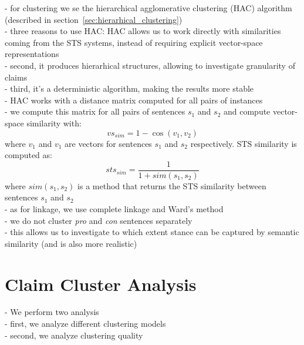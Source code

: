 - for clustering we se the hierarchical agglomerative clustering (HAC) algorithm
(described in section~\ref{sec:hierarhical_clustering}) \\
- three reasons to use HAC: HAC allows us to work directly with similarities
coming from the STS systems, instead of requiring explicit vector-space representations \\
- second, it produces hierarhical structures, allowing to investigate
granularity of claims \\
- third, it's a deterministic algorithm, making the results more stable \\
- HAC works with a distance matrix computed for all pairs of instances \\
- we compute this matrix for all pairs of sentences $s_1$ and $s_2$ and 
compute vector-space similarity with: 
$$
\mathit{vs_{sim}} = 1 - \cos(v_1, v_2)
$$ 
where $v_1$ and $v_1$ are vectors for sentences $s_1$ and $s_2$ respectively.
STS similarity is computed as:
$$
\mathit{sts_{sim}} = \frac{1}{1 + \mathit{sim}(s_1, s_2)}
$$
where $\mathit{sim}(s_1, s_2)$ is a method that returns the STS similarity
between sentences $s_1$ and $s_2$ \\
- as for linkage, we use complete linkage and Ward's method \citep{ward1963hierarchical} \\
- we do not cluster \textit{pro} and \textit{con} sentences separately \\
- this allows us to investigate to which extent stance can be captured by 
semantic similarity (and is also more realistic) \\

\section{Claim Cluster Analysis}

- We perform two analysis \\
- first, we analyze different clustering models \\
- second, we analyze clustering quality \\

